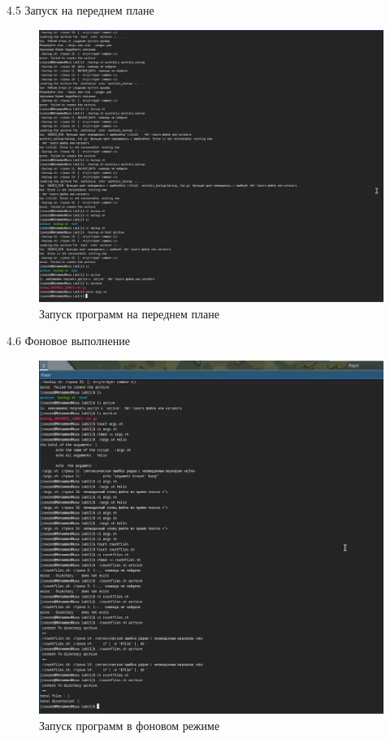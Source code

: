 \documentclass[
  ignorenonframetext,
  aspectratio=169,
  russian,
]{beamer}
\begin{document}
\begin{frame}{4.5 Запуск на переднем плане}
\label{ux437ux430ux43fux443ux441ux43a-ux43dux430-ux43fux435ux440ux435ux434ux43dux435ux43c-ux43fux43bux430ux43dux435}
\begin{figure}[H]

{\centering \includegraphics[width=0.7\linewidth,height=\textheight,keepaspectratio]{image/run1.png}

}

\caption{Запуск программ на переднем плане}

\end{figure}%
\end{frame}

\begin{frame}{4.6 Фоновое выполнение}
\label{ux444ux43eux43dux43eux432ux43eux435-ux432ux44bux43fux43eux43bux43dux435ux43dux438ux435}
\begin{figure}[H]

{\centering \includegraphics[width=0.7\linewidth,height=\textheight,keepaspectratio]{image/run2.png}

}

\caption{Запуск программ в фоновом режиме}

\end{figure}%
\end{frame}
\end{document}
